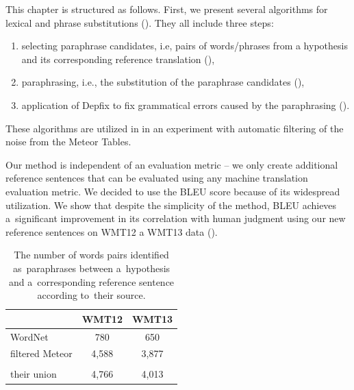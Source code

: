 This chapter is structured as follows. First, we present several algorithms for lexical 
and phrase substitutions (). They all include three steps:

\begin{enumerate}
\item selecting paraphrase candidates, i.e, pairs of words/phrases from a hypothesis
and its corresponding reference translation (), 
\item paraphrasing, i.e., the substitution of the paraphrase candidates (),
\item application of Depfix to fix grammatical errors caused by the paraphrasing 
().
\end{enumerate}

These algorithms are utilized in  in an experiment with automatic 
filtering of the noise from the Meteor Tables. 

Our method is independent of an evaluation metric -- we only create additional 
reference sentences that can be evaluated using any machine translation evaluation
metric. We decided to use the BLEU \citep{bleu} score because of its widespread 
utilization.  We show that despite the simplicity of the method, BLEU achieves 
a~significant improvement in its correlation with human judgment using our new 
reference sentences on WMT12 a WMT13 data ().

\begin{table}[tb]
\begin{center}
\begin{tabular}{lcc}
& \textbf{WMT12} & \textbf{WMT13} \\
\hline
\multicolumn{1}{l|}{WordNet}      &  \multicolumn{1}{c|}{780} & 650 \\
\multicolumn{1}{l|}{filtered Meteor}   & \multicolumn{1}{c|}{4,588} & 3,877 \\
\hline
\multicolumn{3}{c}{} \\[-14pt]
\hline
\multicolumn{1}{l|}{their union}       & \multicolumn{1}{c|}{4,766} & 4,013 \\
\end{tabular}
\caption{The number of words pairs identified as~paraphrases between 
a~hypothesis and a~corresponding reference sentence according to~their source.
}
\label{number_of_substitutions}
\end{center}
\end{table}


